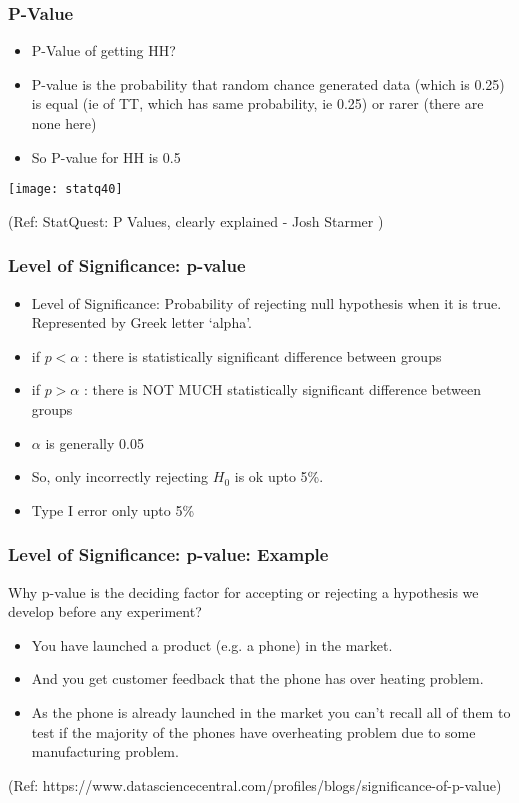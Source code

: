 \begin{frame}[fragile]\frametitle{P-Value}

\begin{itemize}

	\item P-Value of getting HH?
	\item P-value is the probability that random chance generated data (which is 0.25) is equal (ie of TT, which has same probability, ie 0.25) or rarer (there are none here)
	\item So P-value for HH is 0.5
	
	\end{itemize}

      \begin{center}
      \texttt{[image: statq40]}
	  	\end{center}

  
  
 
\tiny{(Ref: StatQuest: P Values, clearly explained - Josh Starmer )}
\end{frame}

\begin{frame}[fragile]\frametitle{Level of Significance: p-value}
\begin{itemize}
\item Level of Significance: Probability of rejecting null  
hypothesis when it is true. Represented by Greek letter `alpha'. 
\item if $p < \alpha$ : there is statistically significant difference between groups
\item if $p > \alpha$ : there is NOT MUCH statistically significant difference between groups
\item $\alpha$ is generally 0.05
\item So, only incorrectly rejecting $H_0$ is ok upto 5\%. 
\item Type I error only upto 5\%
\end{itemize}
\end{frame}

\begin{frame}[fragile]\frametitle{Level of Significance: p-value: Example}
 Why p-value is the deciding factor for accepting or rejecting a hypothesis we
develop before any experiment?
\begin{itemize}
\item You have launched a product (e.g. a phone) in the market. 
\item And you get customer feedback that the phone has over heating problem. 
\item As the phone is already launched in the market you can't recall all of them to test if the majority of the phones have overheating problem due to some manufacturing problem.
\end{itemize}

(Ref: https://www.datasciencecentral.com/profiles/blogs/significance-of-p-value)
\end{frame}


